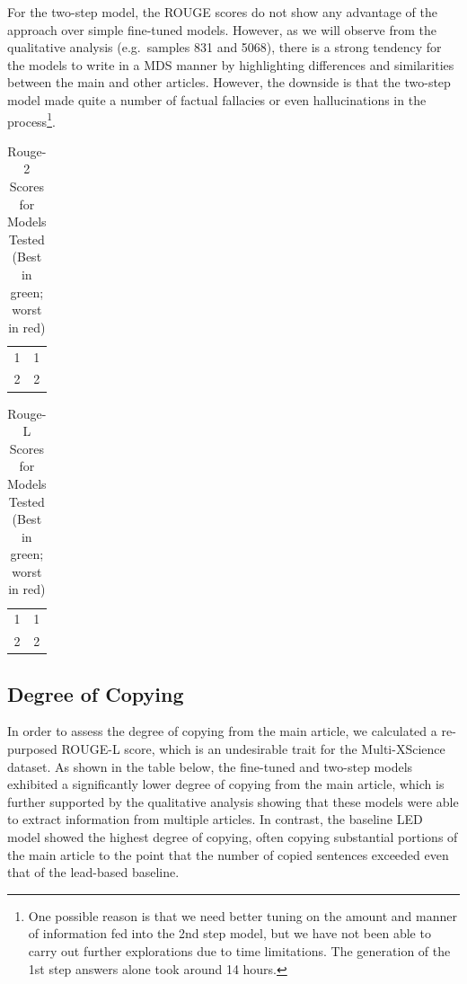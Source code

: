 \documentclass[12pt, twocolumn]{article}
\numberwithin{equation}{section}
\begin{document}
For the two-step model, the ROUGE scores do not show any advantage of the approach over simple fine-tuned models.  However, as we will observe from the qualitative analysis (e.g.~samples 831 and  5068), there is a strong tendency for the models to write in a MDS manner by highlighting differences and similarities between the main and other articles.  However, the downside is that the two-step model made quite a number of factual fallacies or even hallucinations in the process\footnote{One possible reason is that we need better tuning on the amount and manner of information fed into the 2nd step model, but we have not been able to carry out further explorations due to time limitations.  The generation of the 1st step answers alone took around 14 hours.}.

\begin{table}
    \begin{tabular}{|c|c|}
	1 & 1
        \\ 2 & 2
    \end{tabular}
    \caption{Rouge-2 Scores for Models Tested (Best in green; worst in red)}
    \label{tab:rouge-2}
\end{table}

\begin{table}
    \begin{tabular}{|c|c|}
	1 & 1
        \\ 2 & 2
    \end{tabular}
    \caption{Rouge-L Scores for Models Tested (Best in green; worst in red)}
    \label{tab:rouge-l}
\end{table}

\subsection{Degree of Copying}
\label{ssec:results-copy}

In order to assess the degree of copying from the main article, we calculated a re-purposed ROUGE-L score, which is an undesirable trait for the Multi-XScience dataset. As shown in the table below, the fine-tuned and two-step models exhibited a significantly lower degree of copying from the main article, which is further supported by the qualitative analysis showing that these models were able to extract information from multiple articles. In contrast, the baseline LED model showed the highest degree of copying, often copying substantial portions of the main article to the point that the number of copied sentences exceeded even that of the lead-based baseline.
\end{document}
